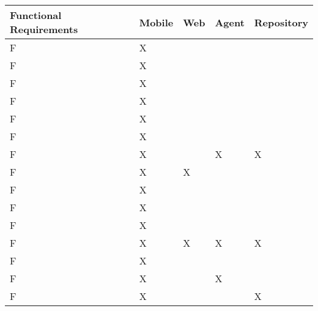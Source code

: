 
\newcommand\rownum{\stepcounter{rownumbers}F\arabic{rownumbers}}

\begin{tabular}{ | l | l | l | l | l |}
\hline
Functional Requirements 											& Mobile & Web & Agent & Repository \\ \hline
\rownum                                                                & X      &     &       &            \\ \hline
\rownum                                                                & X      &     &       &            \\ \hline
\rownum                                                                & X      &     &       &            \\ \hline
\rownum                                                                & X      &     &       &            \\ \hline
\rownum                                                                & X      &     &       &            \\ \hline
\rownum                                                                & X      &     &       &            \\ \hline
\rownum                                                                & X      &     & X     & X          \\ \hline
\rownum                                                                & X      & X   &       &            \\ \hline
\rownum                                                               & X      &     &       &            \\ \hline
\rownum                                                               & X      &     &       &            \\ \hline
\rownum                                                               & X      &     &       &            \\ \hline
\rownum                                                               & X      & X   & X     & X          \\ \hline
\rownum                                                               & X      &     &       &            \\ \hline
\rownum                                                               & X      &     & X     &            \\ \hline
\rownum                                                               & X      &     &       & X          \\ \hline

\end{tabular}
